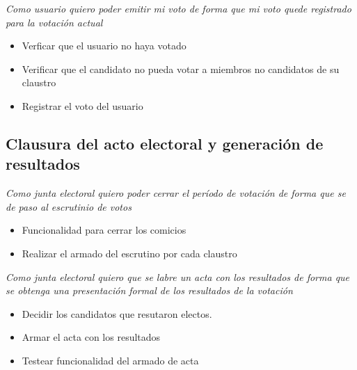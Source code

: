 \medskip

\textsl{Como usuario quiero poder emitir mi voto de forma que mi voto quede registrado para la votaci\'on actual}
\begin{itemize}
 \item Verficar que el usuario no haya votado
 \item Verificar que el candidato no pueda votar a miembros no candidatos de su claustro
 \item Registrar el voto del usuario
\end{itemize}

\bigskip

\subsection*{Clausura del acto electoral y generaci\'on de resultados}

\textsl{Como junta electoral quiero poder cerrar el per\'iodo de votaci\'on de forma que se de paso al escrutinio de votos}
\begin{itemize}
 \item Funcionalidad para cerrar los comicios
 \item Realizar el armado del escrutino por cada claustro
\end{itemize}

\medskip

\textsl{Como junta electoral quiero que se labre un acta con los resultados de forma que se obtenga una presentaci\'on formal de los resultados de la votaci\'on}
\begin{itemize}
 \item Decidir los candidatos que resutaron electos.
 \item Armar el acta con los resultados
 \item Testear funcionalidad del armado de acta
\end{itemize}

\bigskip
  


